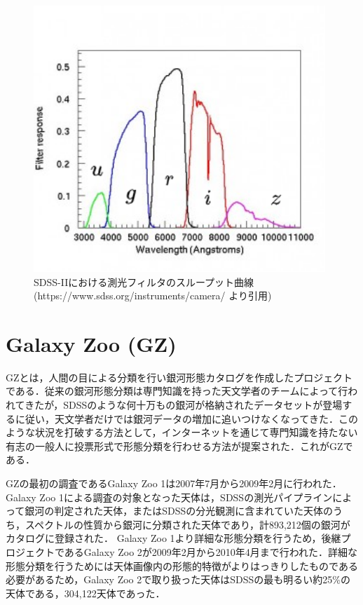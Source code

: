\documentclass[a4j, 11pt]{jreport}
\begin{document}
\begin{figure}[H]
 \centering
 \includegraphics[width=11cm]{images/drawio/filter_responces.png}
 \caption{SDSS-IIにおける測光フィルタのスループット曲線\\(https://www.sdss.org/instruments/camera/ より引用)}
 \label{fig:filter_responces}
\end{figure}



\section{Galaxy Zoo (GZ)}
GZ\cite{Lintott2008}とは，人間の目による分類を行い銀河形態カタログを作成したプロジェクトである．従来の銀河形態分類は専門知識を持った天文学者のチームによって行われてきたが，SDSSのような何十万もの銀河が格納されたデータセットが登場するに従い，天文学者だけでは銀河データの増加に追いつけなくなってきた．このような状況を打破する方法として，インターネットを通じて専門知識を持たない有志の一般人に投票形式で形態分類を行わせる方法が提案された．これがGZである．

GZの最初の調査であるGalaxy Zoo 1\cite{Lintott2010}は2007年7月から2009年2月に行われた．Galaxy Zoo 1による調査の対象となった天体は，SDSSの測光パイプラインによって銀河の判定された天体，またはSDSSの分光観測に含まれていた天体のうち，スペクトルの性質から銀河に分類された天体であり，計893,212個の銀河がカタログに登録された．
Galaxy Zoo 1より詳細な形態分類を行うため，後継プロジェクトであるGalaxy Zoo 2\cite{Willett2013}が2009年2月から2010年4月まで行われた．詳細な形態分類を行うためには天体画像内の形態的特徴がよりはっきりしたものである必要があるため，Galaxy Zoo 2で取り扱った天体はSDSSの最も明るい約25\%の天体である，304,122天体であった．
\end{document}

